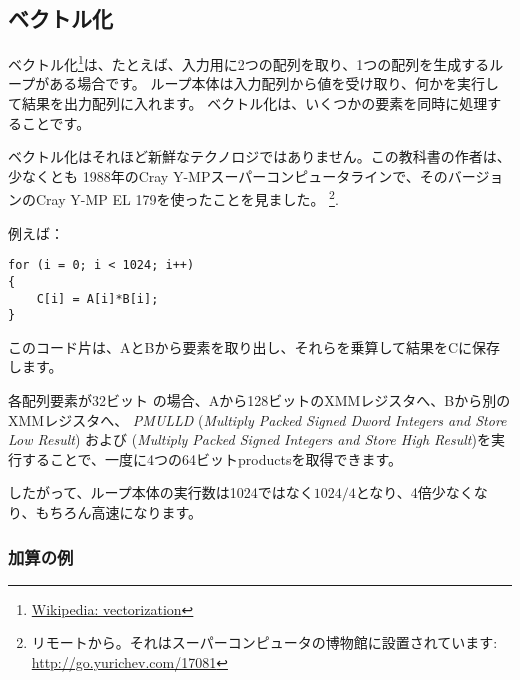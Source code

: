 ﻿\subsection{ベクトル化}

\newcommand{\URLVEC}{\href{http://go.yurichev.com/17080}{Wikipedia: vectorization}}

ベクトル化\footnote{\URLVEC}は、たとえば、入力用に2つの配列を取り、1つの配列を生成するループがある場合です。
ループ本体は入力配列から値を受け取り、何かを実行して結果を出力配列に入れます。
ベクトル化は、いくつかの要素を同時に処理することです。

ベクトル化はそれほど新鮮なテクノロジではありません。この教科書の作者は、少なくとも
1988年のCray Y-MPスーパーコンピュータラインで、そのバージョンのCray Y-MP EL 179を使ったことを見ました。
\footnote{リモートから。それはスーパーコンピュータの博物館に設置されています: \url{http://go.yurichev.com/17081}}.

例えば：

\begin{lstlisting}[style=customc]
for (i = 0; i < 1024; i++)
{
    C[i] = A[i]*B[i];
}
\end{lstlisting}

このコード片は、AとBから要素を取り出し、それらを乗算して結果をCに保存します。

\newcommand{\PMULLD}{\emph{PMULLD} (\emph{Multiply Packed Signed Dword Integers and Store Low Result})}
\newcommand{\PMULHW}{\TT{PMULHW} (\emph{Multiply Packed Signed Integers and Store High Result})}

各配列要素が32ビット \Tint の場合、Aから128ビットのXMMレジスタへ、Bから別のXMMレジスタへ、
\PMULLD{} および \PMULHW{}を実行することで、一度に4つの64ビット\glspl{product}を取得できます。

したがって、ループ本体の実行数は1024ではなく$1024/4$となり、4倍少なくなり、もちろん高速になります。

\newcommand{\URLINTELVEC}{\href{http://go.yurichev.com/17082}{Excerpt: Effective Automatic Vectorization}}

\subsubsection{加算の例}


